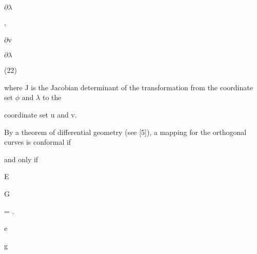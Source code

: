\documentclass[a4paper,portrait,12pt]{article}
\begin{document}
\begin{flushleft}
$\partial$$\lambda$ \newpage
\newpage

\end{flushleft}


\newpage
,


\begin{flushleft}
$\partial$v \newpage
\newpage

\end{flushleft}


\newpage



\begin{flushleft}
$\partial$$\lambda$
\end{flushleft}





(22)





\begin{flushleft}
where J is the Jacobian determinant of the transformation from the coordinate set $\phi$ and $\lambda$ to the
\end{flushleft}


\begin{flushleft}
coordinate set u and v.
\end{flushleft}


\begin{flushleft}
By a theorem of differential geometry (see [5]), a mapping for the orthogonal curves is conformal if
\end{flushleft}


\begin{flushleft}
and only if
\end{flushleft}


\begin{flushleft}
E
\end{flushleft}


\begin{flushleft}
G
\end{flushleft}


= .


\begin{flushleft}
e
\end{flushleft}


\begin{flushleft}
g
\end{flushleft}
\end{document}
